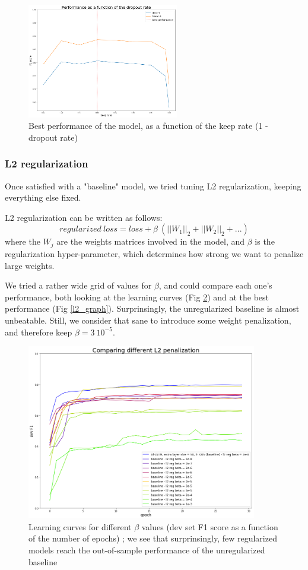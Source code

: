 \documentclass{article} %
\begin{document}
\begin{figure}[h]
\begin{center}
\includegraphics[width=250px]{figs/dr_graph.png}
\caption{Best performance of the model, as a function of the keep rate (1 - dropout rate)}
\label{dr_graph}
\end{center}
\end{figure}

\subsubsection{L2 regularization}

Once satisfied with a "baseline" model, we tried tuning L2 regularization, keeping everything else fixed.

L2 regularization can be written as follows: $$regularized~loss = loss + \beta~(||W_1||_2+||W_2||_2+...)$$ where the $W_j$ are the weights matrices involved in the model, and $\beta$ is the regularization hyper-parameter, which determines how strong we want to penalize large weights.

We tried a rather wide grid of values for $\beta$, and could compare each one's performance, both looking at the learning curves (Fig \ref{l2_devf1}) and at the best performance (Fig \ref{l2_graph}). Surprinsingly, the unregularized baseline is almost unbeatable. Still, we consider that sane to introduce some weight penalization, and therefore keep $\beta=3~10^{-5}$.


\begin{figure}[h]
\begin{center}
\includegraphics[width=380px]{figs/l2_devf1.png}
\caption{Learning curves for different $\beta$ values (dev set F1 score as a function of the number of epochs) ; we see that surprinsingly, few regularized models reach the out-of-sample performance of the unregularized baseline}
\label{l2_devf1}
\end{center}
\end{figure}
\end{document}
